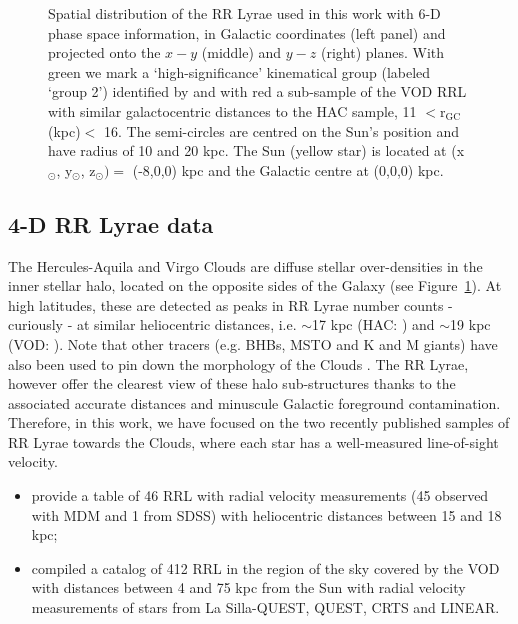\documentclass[fleqn,usenatbib]{mnras}
\begin{document}
\begin{figure}
	\vspace{-0.45cm}
    \caption{Spatial distribution of the RR Lyrae used in this work with 6-D phase space information, in Galactic coordinates (left panel) and projected onto the $x-y$ (middle) and $y-z$ (right) planes. With green we mark a `high-significance' kinematical group (labeled `group 2') identified by \citet{Vivas2016} and with red a sub-sample of the VOD RRL with similar galactocentric distances to the HAC sample, 11 $<\mathrm{r_{GC}}$ (kpc)$<$ 16. The semi-circles are centred on the Sun's position and have radius of 10 and 20 kpc. The Sun (yellow star) is located at (x$_{\odot}$, y$_{\odot}$, z$_{\odot})= $ (-8,0,0) kpc and the Galactic centre at (0,0,0) kpc.  }
    \label{fig:lb}
\end{figure}
%

\subsection{4-D RR Lyrae data}

The Hercules-Aquila and Virgo Clouds are diffuse stellar
over-densities in the inner stellar halo, located on the opposite
sides of the Galaxy (see Figure~\ref{fig:lb}). At high latitudes,
these are detected as peaks in RR Lyrae number counts - curiously - at
similar heliocentric distances, i.e. $\sim$17 kpc (HAC:
\citealt{Wa09,Simion2014}) and $\sim$19 kpc (VOD: \citealt{Vivas2006,
  Duffau2014, Vivas2016}). Note that other tracers (e.g. BHBs, MSTO
and K and M giants) have also been used to pin down the morphology of
the Clouds \citep[see
  e.g.][]{Be07,Juric2008,Sharma2010,Bonaca2012,Conroy2018}. The RR
Lyrae, however offer the clearest view of these halo sub-structures
thanks to the associated accurate distances and minuscule Galactic
foreground contamination. Therefore, in this work, we have focused on
the two recently published samples of RR Lyrae towards the Clouds,
where each star has a well-measured line-of-sight velocity.

\begin{itemize}
\item \citet{Simion2018} provide a table of 46 RRL with radial
  velocity measurements (45 observed with MDM and 1 from SDSS) with
  heliocentric distances between 15 and 18 kpc;
\item \cite{Vivas2016} compiled a catalog of 412 RRL in the region of
  the sky covered by the VOD with distances between 4 and 75 kpc from
  the Sun with radial velocity measurements of stars from La
  Silla-QUEST, QUEST, CRTS and LINEAR.
\end{itemize}
\end{document}
